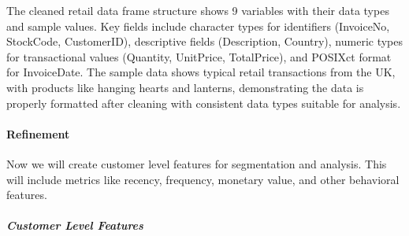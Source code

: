 \documentclass[
]{article}
\newenvironment{Shaded}{\begin{snugshade}}{\end{snugshade}}
\newcommand{\AttributeTok}[1]{\textcolor[rgb]{0.13,0.29,0.53}{#1}}
\newcommand{\DecValTok}[1]{\textcolor[rgb]{0.00,0.00,0.81}{#1}}
\newcommand{\FunctionTok}[1]{\textcolor[rgb]{0.13,0.29,0.53}{\textbf{#1}}}
\newcommand{\NormalTok}[1]{#1}
\newcommand{\OtherTok}[1]{\textcolor[rgb]{0.56,0.35,0.01}{#1}}
\newcommand{\SpecialCharTok}[1]{\textcolor[rgb]{0.81,0.36,0.00}{\textbf{#1}}}
\newcommand{\StringTok}[1]{\textcolor[rgb]{0.31,0.60,0.02}{#1}}
\begin{document}
The cleaned retail data frame structure shows 9 variables with their
data types and sample values. Key fields include character types for
identifiers (InvoiceNo, StockCode, CustomerID), descriptive fields
(Description, Country), numeric types for transactional values
(Quantity, UnitPrice, TotalPrice), and POSIXct format for InvoiceDate.
The sample data shows typical retail transactions from the UK, with
products like hanging hearts and lanterns, demonstrating the data is
properly formatted after cleaning with consistent data types suitable
for analysis.\newpage

\paragraph{Refinement}\label{refinement}

Now we will create customer level features for segmentation and
analysis. This will include metrics like recency, frequency, monetary
value, and other behavioral features.

\subparagraph{Customer Level Features}\label{customer-level-features}

\begin{Shaded}
\end{Shaded}
\end{document}
